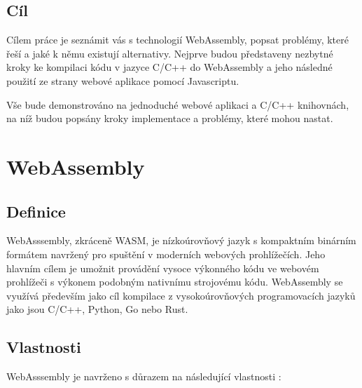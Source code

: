 \documentclass{{template/ctuthesis}}
\begin{document}
\section{Cíl}

Cílem práce je seznámit vás s technologií WebAssembly, popsat problémy, které řeší a jaké k němu existují alternativy. Nejprve budou představeny nezbytné kroky ke kompilaci kódu v jazyce C/C++ do WebAssembly a jeho následné použití ze strany webové aplikace pomocí Javascriptu. 

Vše bude demonstrováno na jednoduché webové aplikaci a C/C++ knihovnách, na níž budou popsány kroky implementace a problémy, které mohou nastat.



\chapter{WebAssembly}
\section{Definice}

WebAsssembly, zkráceně WASM, je nízkoúrovňový jazyk s kompaktním binárním formátem navržený pro spuštění v moderních webových prohlížečích. Jeho hlavním cílem je umožnit provádění vysoce výkonného kódu ve webovém prohlížeči s výkonem podobným nativnímu strojovému kódu. WebAssembly se využívá především jako cíl kompilace z vysokoúrovňových programovacích jazyků jako jsou C/C++, Python, Go nebo Rust.


\section{Vlastnosti}

WebAsssembly je navrženo s důrazem na následující vlastnosti \cite{wasm-specification}:
\end{document}
